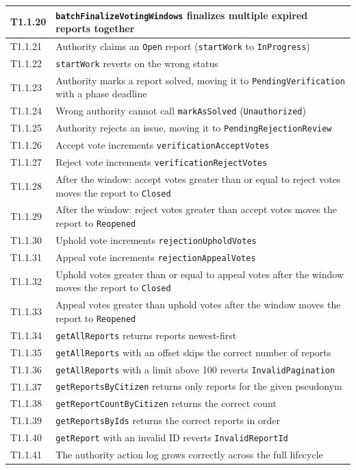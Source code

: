 \begin{longtable}{p{}|p{}}
\hline
T1.1.20 & \texttt{batchFinalizeVotingWindows} finalizes multiple expired reports together \\
\hline
T1.1.21 & Authority claims an \texttt{Open} report (\texttt{startWork} to \texttt{InProgress}) \\
\hline
T1.1.22 & \texttt{startWork} reverts on the wrong status \\
\hline
T1.1.23 & Authority marks a report solved, moving it to \texttt{PendingVerification} with a phase deadline \\
\hline
T1.1.24 & Wrong authority cannot call \texttt{markAsSolved} (\texttt{Unauthorized}) \\
\hline
T1.1.25 & Authority rejects an issue, moving it to \texttt{PendingRejectionReview} \\
\hline
T1.1.26 & Accept vote increments \texttt{verificationAcceptVotes} \\
\hline
T1.1.27 & Reject vote increments \texttt{verificationRejectVotes} \\
\hline
T1.1.28 & After the window: accept votes greater than or equal to reject votes moves the report to \texttt{Closed} \\
\hline
T1.1.29 & After the window: reject votes greater than accept votes moves the report to \texttt{Reopened} \\
\hline
T1.1.30 & Uphold vote increments \texttt{rejectionUpholdVotes} \\
\hline
T1.1.31 & Appeal vote increments \texttt{rejectionAppealVotes} \\
\hline
T1.1.32 & Uphold votes greater than or equal to appeal votes after the window moves the report to \texttt{Closed} \\
\hline
T1.1.33 & Appeal votes greater than uphold votes after the window moves the report to \texttt{Reopened} \\
\hline
T1.1.34 & \texttt{getAllReports} returns reports newest-first \\
\hline
T1.1.35 & \texttt{getAllReports} with an offset skips the correct number of reports \\
\hline
T1.1.36 & \texttt{getAllReports} with a limit above 100 reverts \texttt{InvalidPagination} \\
\hline
T1.1.37 & \texttt{getReportsByCitizen} returns only reports for the given pseudonym \\
\hline
T1.1.38 & \texttt{getReportCountByCitizen} returns the correct count \\
\hline
T1.1.39 & \texttt{getReportsByIds} returns the correct reports in order \\
\hline
T1.1.40 & \texttt{getReport} with an invalid ID reverts \texttt{InvalidReportId} \\
\hline
T1.1.41 & The authority action log grows correctly across the full lifecycle \\

\end{longtable}

